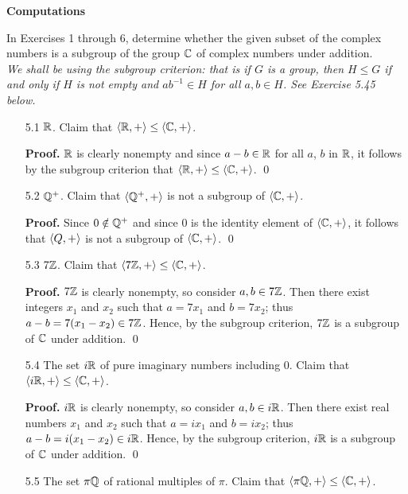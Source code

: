 \noindent      \textbf{Computations}

\noindent      In Exercises 1 through 6, determine whether the given subset of 
               the complex numbers is a subgroup of the group $\mathbb{C}$ of complex 
               numbers under addition. \\

\noindent      \textit{We shall be using the subgroup criterion: that is if $G$ 
               is a group, then $H \le G$ if and only if $H$ is not empty and 
               $ab^{-1} \in H$ for all $a, b \in H$. See Exercise 5.45 below.}

\begin{enumerate}
   \item[5.1]  $\mathbb{R}$. Claim that $\langle \mathbb{R}, + \rangle \le \langle \mathbb{C}, + \rangle$.

      \textbf{Proof.} $\mathbb{R}$ is clearly nonempty and since $a - b \in \mathbb{R}$ for all
      $a$, $b$ in $\mathbb{R}$, it follows by the subgroup criterion that
      $\langle \mathbb{R}, + \rangle \le \langle \mathbb{C}, + \rangle$. \qed
   \item[5.2]  $\mathbb{Q}^+$. Claim that $\langle \mathbb{Q}^+, + \rangle$ is not a subgroup of
               $\langle \mathbb{C}, + \rangle$.

      \textbf{Proof.} Since $0 \notin \mathbb{Q}^+$ and since 0 is the identity 
      element of $\langle \mathbb{C}, + \rangle$, it follows that $\langle Q, + \rangle$ is not a subgroup
      of $\langle \mathbb{C}, + \rangle$. \qed
   \item[5.3]  $7\mathbb{Z}$. Claim that $\langle 7\mathbb{Z}, + \rangle \le \langle \mathbb{C}, + \rangle$.

      \textbf{Proof.} $7\mathbb{Z}$ is clearly nonempty, so consider $a, b \in 7\mathbb{Z}$.
      Then there exist integers $x_1$ and $x_2$ such that $a = 7x_1$ and
      $b = 7x_2$; thus $a - b = 7(x_1 - x_2) \in 7\mathbb{Z}$. Hence, by the subgroup
      criterion, $7\mathbb{Z}$ is a subgroup of $\mathbb{C}$ under addition. \qed
   \item[5.4]  The set $i\mathbb{R}$ of pure imaginary numbers including 0. Claim that
               $\langle i\mathbb{R}, + \rangle \le \langle \mathbb{C}, + \rangle$.

      \textbf{Proof.} $i\mathbb{R}$ is clearly nonempty, so consider $a, b \in i\mathbb{R}$.
      Then there exist real numbers $x_1$ and $x_2$ such that $a = ix_1$ and
      $b = ix_2$; thus $a - b = i(x_1 - x_2) \in i\mathbb{R}$. Hence, by the subgroup
      criterion, $i\mathbb{R}$ is a subgroup  of $\mathbb{C}$ under addition. \qed
   \item[5.5]  The set $\pi\mathbb{Q}$ of rational multiples of $\pi$. Claim that
               $\langle \pi\mathbb{Q}, + \rangle \le \langle \mathbb{C}, + \rangle$.


\end{enumerate}
